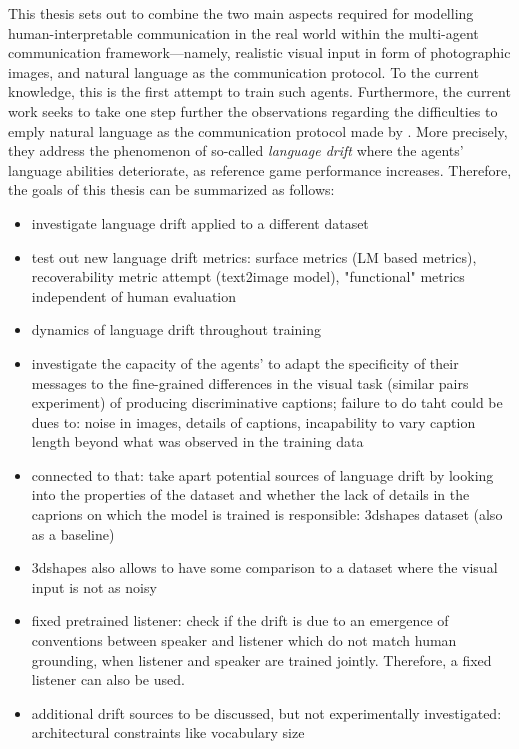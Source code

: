 This thesis sets out to combine the two main aspects required for modelling human-interpretable communication in the real world within the multi-agent communication framework---namely, realistic visual input in form of photographic images, and natural language as the communication protocol. To the current knowledge, this is the first attempt to train such agents. 
Furthermore, the current work seeks to take one step further the observations regarding the difficulties to emply natural language as the communication protocol made by \parencite{lazaridou2020multi}. More precisely, they address the phenomenon of so-called \textit{language drift} where the agents' language abilities deteriorate, as reference game performance increases. Therefore, the goals of this thesis can be summarized as follows: 
\begin{itemize}
	\item investigate language drift applied to a different dataset
	\item test out new language drift metrics: surface metrics (LM based metrics), recoverability metric attempt (text2image model), "functional" metrics independent of human evaluation
	\item dynamics of language drift throughout training
	\item investigate the capacity of the agents' to adapt the specificity of their messages to the fine-grained differences in the visual task (similar pairs experiment) of producing discriminative captions; failure to do taht could be dues to: noise in images, details of captions, incapability to vary caption length beyond what was observed in the training data
	\item connected to that: take apart potential sources of language drift by looking into the properties of the dataset and whether the lack of details in the caprions on which the model is trained is responsible: 3dshapes dataset (also as a baseline) 
	\item 3dshapes also allows to have some comparison to a dataset where the visual input is not as noisy 
	\item fixed pretrained listener: check if the drift is due to an emergence of conventions between speaker and listener which do not match human grounding, when listener and speaker are trained jointly. Therefore, a fixed listener can also be used. 
	\item additional drift sources to be discussed, but not experimentally investigated: architectural constraints like vocabulary size
\end{itemize}

